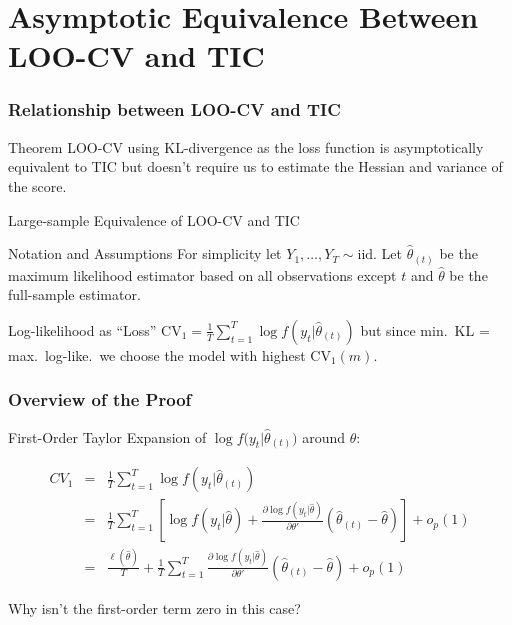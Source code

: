 \section{Asymptotic Equivalence Between LOO-CV and TIC}
\begin{frame}
  \frametitle{Relationship between LOO-CV and TIC}
  \begin{block}{Theorem}
  LOO-CV using KL-divergence as the loss function is asymptotically equivalent to TIC but doesn't require us to estimate the Hessian and variance of the score. 
  \end{block}
\end{frame}
\begin{frame}{Large-sample Equivalence of LOO-CV and TIC}
  
  \begin{block}{Notation and Assumptions}
    For simplicity let $Y_1, \dots, Y_T \sim \text{iid}$.
    Let $\widehat{\theta}_{(t)}$ be the maximum likelihood estimator based on all observations \alert{except $t$} and $\widehat{\theta}$ be the full-sample estimator.
  \end{block}

  

  \begin{block}{Log-likelihood as ``Loss''}
    $\text{CV}_1 = \frac{1}{T} \sum_{t=1}^T \log f(y_t|\widehat{\theta}_{(t)})$ but since min.\ KL = max.\ log-like.\ we choose the model with \alert{highest} $\text{CV}_1(m)$.
  \end{block}
\end{frame}
\begin{frame}
  \frametitle{Overview of the Proof}
    
  First-Order Taylor Expansion of $\log f\big(y_t|\widehat{\theta}_{(t)}\big)$ around $\widehat{\theta}$:

    \vspace{-2em}

	\begin{eqnarray*}
		CV_1 &=& \frac{1}{T} \sum_{t=1}^T \log f(y_t|\widehat{\theta}_{(t)})\\ 
			&=&\frac{1}{T} \sum_{t=1}^T \left[\log f(y_t|\widehat{\theta}) + \frac{\partial \log f(y_t|\widehat{\theta})}{\partial \theta'}\left(\widehat{\theta}_{(t)} - \widehat{\theta} \right) \right] + o_p(1)\\ 
			&=& \frac{\ell(\widehat{\theta})}{T} + \frac{1}{T}\sum_{t=1}^T \frac{\partial \log f(y_t|\widehat{\theta})}{\partial \theta'}\left(\widehat{\theta}_{(t)} - \widehat{\theta} \right) + o_p(1)
	\end{eqnarray*}

  \alert{Why isn't the first-order term zero in this case?}

\end{frame}

